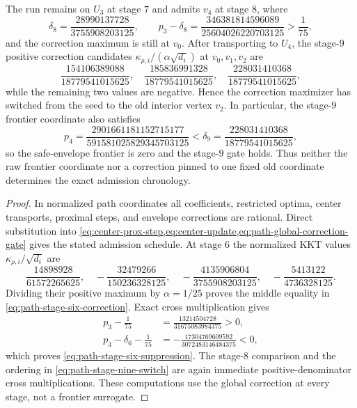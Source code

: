 \begin{proposition}
The run remains on $U_3$ at stage $7$ and admits $v_4$ at stage $8$, where
\begin{equation*}
 \delta_8=\frac{28990137728}{3755908203125},
 \qquad
 p_3-\delta_8
 =\frac{346381814596089}{25604026220703125}>\frac1{75},
\end{equation*}
and the correction maximum is still at $v_0$.  After transporting to $U_4$,
the stage-$9$ positive correction candidates
$\kappa_{\rho,i}/(\alpha\sqrt{d_i})$ at $v_0,v_1,v_2$ are
\begin{equation}
 \frac{154106389088}{18779541015625},
 \quad
 \frac{185836991328}{18779541015625},
 \quad
 \frac{228031410368}{18779541015625},
 \label{eq:path-stage-nine-switch}
\end{equation}
while the remaining two values are negative.  Hence the correction maximizer
has switched from the seed to the old interior vertex $v_2$.  In particular,
the stage-$9$ frontier coordinate also satisfies
\begin{equation*}
 p_4=\frac{2901661181152715177}{591581025829345703125}
 <\delta_9=\frac{228031410368}{18779541015625},
\end{equation*}
so the safe-envelope frontier is zero and the stage-$9$ gate holds.  Thus
neither the raw frontier coordinate nor a correction pinned to one fixed old
coordinate determines the exact admission chronology.
\end{proposition}

\begin{proof}
In normalized path coordinates all coefficients, restricted optima, center
transports, proximal steps, and envelope corrections are rational.  Direct
substitution into
\cref{eq:center-prox-step,eq:center-update,eq:path-global-correction-gate}
gives the stated admission schedule.  At stage $6$ the normalized KKT values
$\kappa_{\rho,i}/\sqrt{d_i}$ are
\begin{equation*}
 \frac{14898928}{61572265625},
 \quad
 -\frac{32479266}{150236328125},
 \quad
 -\frac{4135906804}{3755908203125},
 \quad
 -\frac{5413122}{4736328125}.
\end{equation*}
Dividing their positive maximum by $\alpha=1/25$ proves the middle equality
in \cref{eq:path-stage-six-correction}.  Exact cross multiplication gives
\begin{align*}
 p_3-\frac1{75}
 &=\frac{13214504728}{31675083984375}>0,\\
 p_3-\delta_6-\frac1{75}
 &=-\frac{17304769609592}{3072483146484375}<0,
\end{align*}
which proves \cref{eq:path-stage-six-suppression}.  The stage-$8$ comparison
and the ordering in \cref{eq:path-stage-nine-switch} are again immediate
positive-denominator cross multiplications.  These computations use the
global correction at every stage, not a frontier surrogate.
\end{proof}


